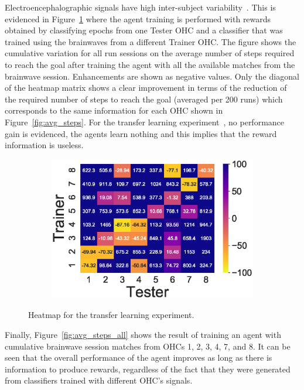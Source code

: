 \documentclass[journal]{IEEEtran}
\begin{document}
{{Electroencephalographic signals have high inter-subject variability~\cite{Chavarriaga2014}.  This is evidenced in Figure~\ref{fig:transferlearning} where the agent training is performed with rewards obtained by classifying epochs from one Tester OHC and a classifier that was trained using the brainwaves from a different Trainer OHC.  The figure shows the cumulative variation for all run sessions on the average number of steps required to reach the goal after training the agent with all the available matches from the brainwave session.  Enhancements are shown as negative values.  Only the diagonal of the heatmap matrix shows a clear improvement in terms of the reduction of the required number of steps to reach the goal (averaged per 200 runs) which corresponds to the same information for each OHC shown in Figure~\ref{fig:avg_steps}.  For the transfer learning experiment~\cite{Wu2016}, no performance gain is evidenced, the agents learn nothing and this implies that the reward information is useless.


\begin{figure}[h!]
\begin{subfigure}{0.5\textwidth}
\includegraphics[scale=0.60]{revisedimages/transfer_learning_heatmap.eps}
\end{subfigure}
\caption{Heatmap for the transfer learning experiment.  }
\label{fig:transferlearning}
\end{figure}

Finally, Figure~\ref{fig:avg_steps_all} shows the result of training an agent with cumulative brainwave session matches from OHCs 1, 2, 3, 4, 7, and 8.  It can be seen that the overall performance of the agent improves as long as there is information to produce rewards, regardless of the fact that they were generated from classifiers trained with different OHC's signals.


}}
\end{document}
